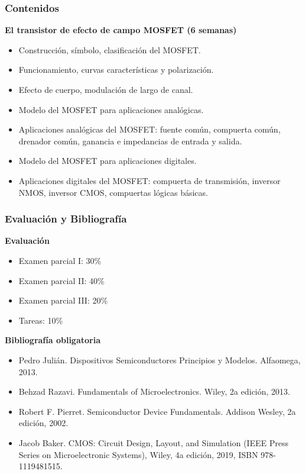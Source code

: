 \documentclass[10pt,t,aspectratio=169]{beamer}
\begin{document}
\begin{frame}[t]
\frametitle{Contenidos}

\textbf{El transistor de efecto de campo MOSFET (6 semanas)}

\begin{itemize}
	\item Construcción, símbolo, clasificación del MOSFET.
	\item Funcionamiento, curvas características y polarización.
	\item Efecto de cuerpo, modulación de largo de canal.
	\item Modelo del MOSFET para aplicaciones analógicas.
	\item Aplicaciones analógicas del MOSFET: fuente común, compuerta común, drenador común, ganancia e impedancias de entrada y salida.
	\item Modelo del MOSFET para aplicaciones digitales.
	\item Aplicaciones digitales del MOSFET: compuerta de transmisión, inversor NMOS, inversor CMOS, compuertas lógicas básicas. 
\end{itemize}
\end{frame}

\begin{frame}[t]
\frametitle{Evaluación y Bibliografía}
\textbf{Evaluación} 

\begin{itemize}
	\item Examen parcial I: 30\%
	\item Examen parcial II: 40\%
	\item Examen parcial III: 20\%
	\item Tareas: 10\%
\end{itemize}

\vspace{5mm}
\textbf{Bibliografía obligatoria}

\begin{itemize}
	\item Pedro Julián. Dispositivos Semiconductores Principios y Modelos. Alfaomega, 2013.
	\item Behzad Razavi. Fundamentals of Microelectronics. Wiley, 2a edición, 2013.
	\item Robert F. Pierret. Semiconductor Device Fundamentals. Addison Wesley, 2a edición, 2002.
	\item Jacob Baker. CMOS: Circuit Design, Layout, and Simulation (IEEE Press Series on Microelectronic Systems), Wiley, 4a edición, 2019, ISBN 978-1119481515.
\end{itemize}
\end{frame}
\end{document}
